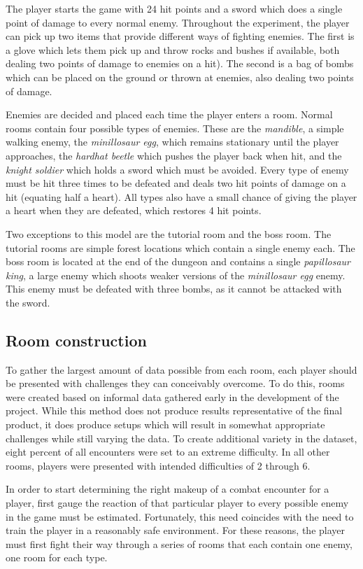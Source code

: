 \documentclass[a4paper]{article}
\begin{document}
\begin{multicols*}{2}
The player starts the game with 24 hit points and a sword which does a single point of damage to every normal enemy. Throughout the experiment, the player can pick up two items that provide different ways of fighting enemies. The first is a glove which lets them pick up and throw rocks and bushes if available, both dealing two points of damage to enemies on a hit). The second is a bag of bombs which can be placed on the ground or thrown at enemies, also dealing two points of damage. 

Enemies are decided and placed each time the player enters a room. Normal rooms contain four possible types of enemies. These are the \emph{mandible}, a simple walking enemy, the \emph{minillosaur egg}, which remains stationary until the player approaches, the \emph{hardhat beetle} which pushes the player back when hit, and the \emph{knight soldier} which holds a sword which must be avoided. Every type of enemy must be hit three times to be defeated and deals two hit points of damage on a hit (equating half a heart). All types also have a small chance of giving the player a heart when they are defeated, which restores 4 hit points.

Two exceptions to this model are the tutorial room and the boss room. The tutorial rooms are simple forest locations which contain a single enemy each. The boss room is located at the end of the dungeon and contains a single \emph{papillosaur king}, a large enemy which shoots weaker versions of the \emph{minillosaur egg} enemy. This enemy must be defeated with three bombs, as it cannot be attacked with the sword.

\subsection{Room construction}
To gather the largest amount of data possible from each room, each player should be presented with challenges they can conceivably overcome. To do this, rooms were created based on informal data gathered early in the development of the project. While this method does not produce results representative of the final product, it does produce setups which will result in somewhat appropriate challenges while still varying the data. To create additional variety in the dataset, eight percent of all encounters were set to an extreme difficulty. In all other rooms, players were presented with intended difficulties of 2 through 6.

In order to start determining the right makeup of a combat encounter for a player, first gauge the reaction of that particular player to every possible enemy in the game must be estimated. Fortunately, this need coincides with the need to train the player in a reasonably safe environment. For these reasons, the player must first fight their way through a series of rooms that each contain one enemy, one room for each type. 


\end{multicols*}
\end{document}
